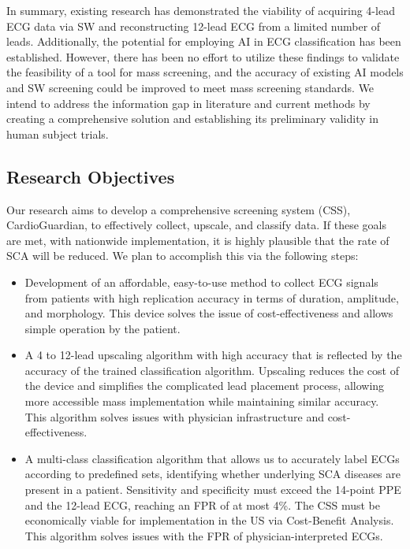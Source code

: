 \documentclass[
	a4paper, 
	10pt, 
	twoside, 
]{LTJournalArticle}
\begin{document}
In summary, existing research has demonstrated the viability of acquiring 4-lead ECG data via SW and reconstructing 12-lead ECG from a limited number of leads. Additionally, the potential for employing AI in ECG classification has been established. However, there has been no effort to utilize these findings to validate the feasibility of a tool for mass screening, and the accuracy of existing AI models and SW screening could be improved to meet mass screening standards. We intend to address the information gap in literature and current methods by creating a comprehensive solution and establishing its preliminary validity in human subject trials.
\subsection{Research Objectives}
Our research aims to develop a comprehensive screening system (CSS), CardioGuardian, to effectively collect, upscale, and classify data. If these goals are met, with nationwide implementation, it is highly plausible that the rate of SCA will be reduced. We plan to accomplish this via the following steps:
\begin{itemize}
    \item Development of an affordable, easy-to-use method to collect ECG signals from patients with high replication accuracy in terms of duration, amplitude, and morphology. This device solves the issue of cost-effectiveness and allows simple operation by the patient.
    \item A 4 to 12-lead upscaling algorithm with high accuracy that is reflected by the accuracy of the trained classification algorithm. Upscaling reduces the cost of the device and simplifies the complicated lead placement process, allowing more accessible mass implementation while maintaining similar accuracy. This algorithm solves issues with physician infrastructure and cost-effectiveness.
    \item A multi-class classification algorithm that allows us to accurately label ECGs according to predefined sets, identifying whether underlying SCA diseases are present in a patient. Sensitivity and specificity must exceed the 14-point PPE and the 12-lead ECG, reaching an FPR of at most 4\%. The CSS must be economically viable for implementation in the US via Cost-Benefit Analysis. This algorithm solves issues with the FPR of physician-interpreted ECGs. 
\end{itemize}
\newpage
\end{document}
